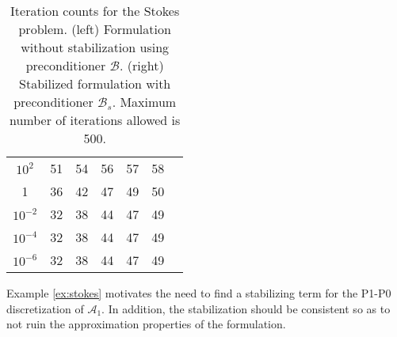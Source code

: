 \begin{example}
\begin{table}
{\begin{minipage}{0.49\textwidth}
\begin{center}
\begin{tabular}{c|cccccc}
$10^{2}$ & 51 & 54 & 56 & 57 & 58\\
1 & 36 & 42 & 47 & 49 & 50\\
$10^{-2}$ & 32 & 38 & 44 & 47 & 49\\
$10^{-4}$ & 32 & 38 & 44 & 47 & 49\\
$10^{-6}$ & 32 & 38 & 44 & 47 & 49\\
\hline
  \end{tabular}
  \end{center}
  \end{minipage}
  }
    \caption{Iteration counts for the Stokes problem. (left) Formulation without
      stabilization using preconditioner $\mathcal{B}$. (right) Stabilized
      formulation with preconditioner $\mathcal{B}_s$. Maximum number of
    iterations allowed is 500.}
  \label{tab:stokes}
  \end{table}
\end{example}

Example \ref{ex:stokes} motivates the need to find a stabilizing term
for the P1-P0 discretization of $\mathcal{A}_1$. In addition, the stabilization
should be consistent so as to not ruin the approximation properties of the
formulation.

